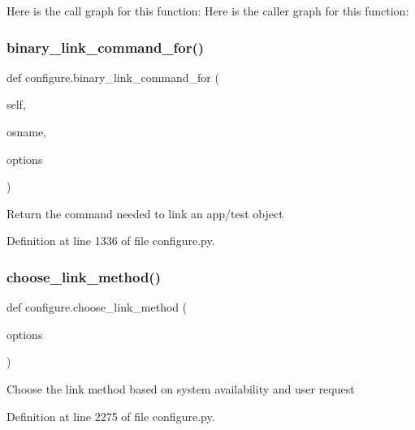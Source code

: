 Here is the call graph for this function\+:
Here is the caller graph for this function\+:
\mbox{\label{namespaceconfigure_a6d2c0646f8822fbf51dd20e1dd81d1ad}} 
\subsubsection{\texorpdfstring{binary\+\_\+link\+\_\+command\+\_\+for()}{binary\_link\_command\_for()}}
{\footnotesize\ttfamily def configure.\+binary\+\_\+link\+\_\+command\+\_\+for (\begin{DoxyParamCaption}\item[{}]{self,  }\item[{}]{osname,  }\item[{}]{options }\end{DoxyParamCaption})}

\begin{DoxyVerb}Return the command needed to link an app/test object
\end{DoxyVerb}
 

Definition at line 1336 of file configure.\+py.

\mbox{\label{namespaceconfigure_a5d2c022a14a541e23a9285c69e470d3e}} 
\subsubsection{\texorpdfstring{choose\+\_\+link\+\_\+method()}{choose\_link\_method()}}
{\footnotesize\ttfamily def configure.\+choose\+\_\+link\+\_\+method (\begin{DoxyParamCaption}\item[{}]{options }\end{DoxyParamCaption})}

\begin{DoxyVerb}Choose the link method based on system availability and user request
\end{DoxyVerb}
 

Definition at line 2275 of file configure.\+py.

